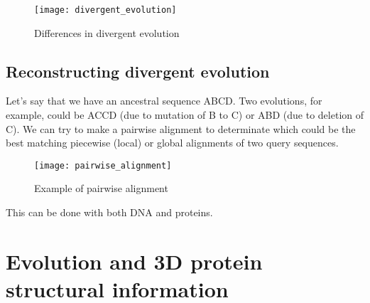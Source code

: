 \begin{figure}
\centering
\texttt{[image: divergent\_evolution]}
\caption{Differences in divergent evolution}
\label{Differences in divergent evolution}
\end{figure}

\subsection{Reconstructing divergent evolution}

Let's say that we have an ancestral sequence ABCD. Two evolutions, for example, 
could be ACCD (due to mutation of B to C) or ABD (due to deletion of C).
We can try to make a pairwise alignment to determinate which could be the best 
matching piecewise (local) or global alignments of two query sequences.

\begin{figure}
\centering
\texttt{[image: pairwise\_alignment]}
\caption{Example of pairwise alignment}
\label{Example of pairwise alignment}
\end{figure}

This can be done with both DNA and proteins.

\section{Evolution and 3D protein structural information}
